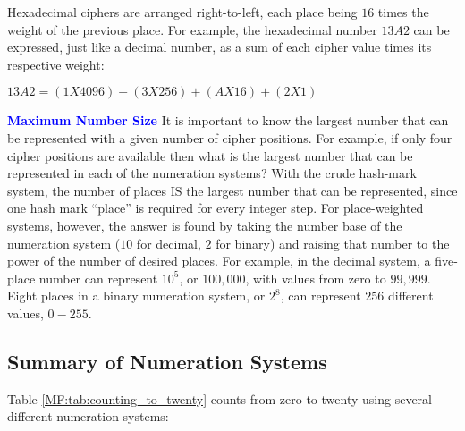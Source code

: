Hexadecimal ciphers are arranged right-to-left, each place being $ 16 $ times the weight of the previous place. For example, the hexadecimal number $ 13A2 $ can be expressed, just like a decimal number, as a sum of each cipher value times its respective weight:

\begin{center}
  $13A2 = (1 X 4096) + (3 X 256) + (A X 16) + (2 X 1)$
\end{center}

\begin{tcolorbox}[colback=blue!5!white,colframe=blue!75!black]
  \textcolor{blue}{\textbf{Maximum Number Size}}
  \tcblower
  It is important to know the largest number that can be represented with a given number of cipher positions. For example, if only four cipher positions are available then what is the largest number that can be represented in each of the numeration systems? With the crude hash-mark system, the number of places IS the largest number that can be represented, since one hash mark ``place'' is required for every integer step. For place-weighted systems, however, the answer is found by taking the number base of the numeration system ($ 10 $ for decimal, $ 2 $ for binary) and raising that number to the power of the number of desired places. For example, in the decimal system, a five-place number can represent $ 10^{5} $, or $ 100,000 $, with values from zero to $ 99,999 $. Eight places in a binary numeration system, or $ 2^{8} $, can represent $ 256 $ different values, $ 0 - 255 $.
\end{tcolorbox}

\subsection{Summary of Numeration Systems}
\label{MF:sub:summary_of_numeration_systems}
Table \ref{MF:tab:counting_to_twenty} counts from zero to twenty using several different numeration systems:

